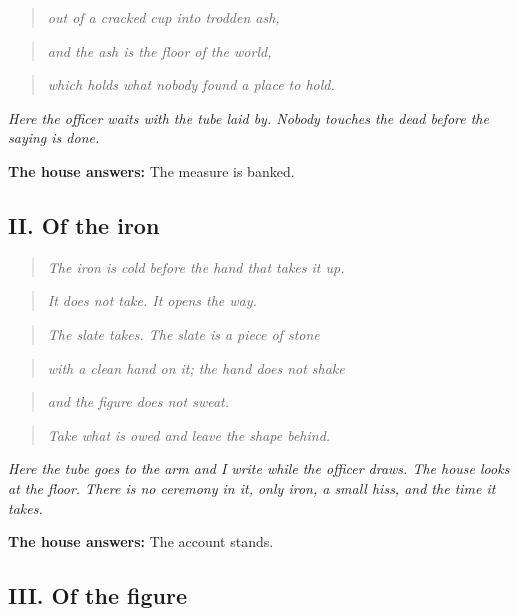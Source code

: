 \documentclass{design/chronicle}
\begin{document}
\begin{quote}\itshape out of a cracked cup into trodden ash,\end{quote}

\begin{quote}\itshape and the ash is the floor of the world,\end{quote}

\begin{quote}\itshape which holds what nobody found a place to hold.\end{quote}

\emph{Here the officer waits with the tube laid by. Nobody touches the dead before the saying is done.}

\textbf{The house answers:} The measure is banked.

\subsection*{II. Of the iron}

\begin{quote}\itshape The iron is cold before the hand that takes it up.\end{quote}

\begin{quote}\itshape It does not take. It opens the way.\end{quote}

\begin{quote}\itshape The slate takes. The slate is a piece of stone\end{quote}

\begin{quote}\itshape with a clean hand on it; the hand does not shake\end{quote}

\begin{quote}\itshape and the figure does not sweat.\end{quote}

\begin{quote}\itshape Take what is owed and leave the shape behind.\end{quote}

\emph{Here the tube goes to the arm and I write while the officer draws. The house looks at the floor. There is no ceremony in it, only iron, a small hiss, and the time it takes.}

\textbf{The house answers:} The account stands.

\subsection*{III. Of the figure}
\end{document}
